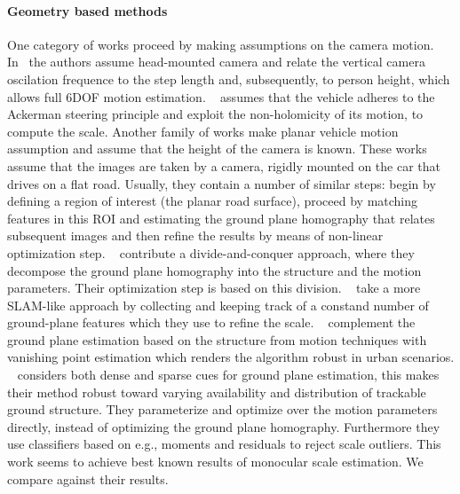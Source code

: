 \paragraph{Geometry based methods} One category of works proceed by
making assumptions on the camera motion. In~\cite{gutierrez2012full}
the authors assume head-mounted camera and relate the vertical camera
oscilation frequence to the step length and, subsequently, to person
height, which allows full 6DOF motion
estimation. ~\cite{scaramuzza2009absolute} assumes that the vehicle
adheres to the Ackerman steering principle and exploit the
non-holomicity of its motion, to compute the scale.  Another family of
works make planar vehicle motion assumption and assume that the height
of the camera is known.  These works assume that the images are taken
by a camera, rigidly mounted on the car that drives on a flat
road. Usually, they contain a number of similar steps: begin by
defining a region of interest (the planar road surface), proceed by
matching features in this ROI and estimating the ground plane
homography that relates subsequent images and then refine the results
by means of non-linear optimization step.  ~\cite{zhou2016reliable}
contribute a divide-and-conquer approach, where they decompose the
ground plane homography into the structure and the motion parameters.
Their optimization step is based on this division.
~\cite{kitt2011monocular} take a more SLAM-like approach by collecting
and keeping track of a constand number of ground-plane features which
they use to refine the scale.  ~\cite{grater2015robust} complement the
ground plane estimation based on the structure from motion techniques
with vanishing point estimation which renders the algorithm robust in
urban scenarios. ~\cite{7995955} considers both dense and sparse cues
for ground plane estimation, this makes their method robust toward
varying availability and distribution of trackable ground structure.
They parameterize and optimize over the motion parameters directly,
instead of optimizing the ground plane homography.  Furthermore they
use classifiers based on e.g., moments and residuals to reject scale
outliers.  This work seems to achieve best known results of monocular
scale estimation.  We compare against their results.


